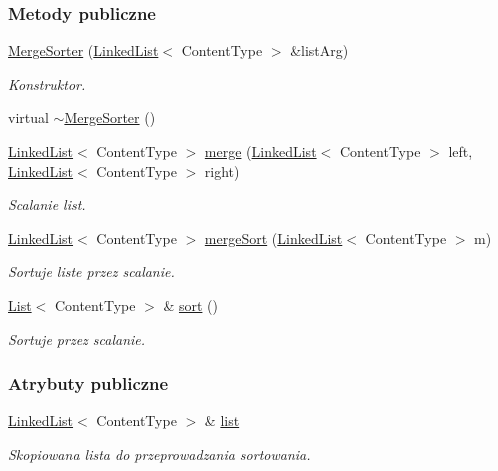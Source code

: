 \subsubsection*{Metody publiczne}
\begin{DoxyCompactItemize}
\item 
\hyperlink{class_merge_sorter_a3619db6a163eda2c7f7cc2b00a51c37e}{Merge\-Sorter} (\hyperlink{class_linked_list}{Linked\-List}$<$ Content\-Type $>$ \&list\-Arg)
\begin{DoxyCompactList}\small\item\em Konstruktor. \end{DoxyCompactList}\item 
virtual \hyperlink{class_merge_sorter_a6a3cb4db35f400c488ffb3237e112905}{$\sim$\-Merge\-Sorter} ()
\item 
\hyperlink{class_linked_list}{Linked\-List}$<$ Content\-Type $>$ \hyperlink{class_merge_sorter_a83889d82600458b85cb9fb46fcd5acdd}{merge} (\hyperlink{class_linked_list}{Linked\-List}$<$ Content\-Type $>$ left, \hyperlink{class_linked_list}{Linked\-List}$<$ Content\-Type $>$ right)
\begin{DoxyCompactList}\small\item\em Scalanie list. \end{DoxyCompactList}\item 
\hyperlink{class_linked_list}{Linked\-List}$<$ Content\-Type $>$ \hyperlink{class_merge_sorter_a18cea501ccb017ea6a725698254ccd3f}{merge\-Sort} (\hyperlink{class_linked_list}{Linked\-List}$<$ Content\-Type $>$ m)
\begin{DoxyCompactList}\small\item\em Sortuje liste przez scalanie. \end{DoxyCompactList}\item 
\hyperlink{class_list}{List}$<$ Content\-Type $>$ \& \hyperlink{class_merge_sorter_a4c0c1cf429c3d20dacea113c9669528a}{sort} ()
\begin{DoxyCompactList}\small\item\em Sortuje przez scalanie. \end{DoxyCompactList}\end{DoxyCompactItemize}
\subsubsection*{Atrybuty publiczne}
\begin{DoxyCompactItemize}
\item 
\hyperlink{class_linked_list}{Linked\-List}$<$ Content\-Type $>$ \& \hyperlink{class_merge_sorter_a2fdeadd95d226a04243bab8b5104e324}{list}
\begin{DoxyCompactList}\small\item\em Skopiowana lista do przeprowadzania sortowania. \end{DoxyCompactList}\end{DoxyCompactItemize}


